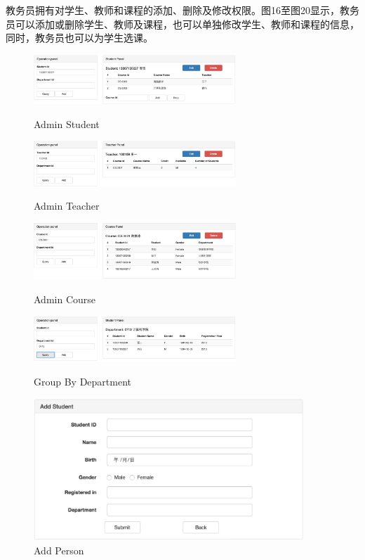 \documentclass[a4paper, 11pt, nofonts, nocap, fancyhdr]{ctexart}
\begin{document}
	教务员拥有对学生、教师和课程的添加、删除及修改权限。图16至图20显示，教务员可以添加或删除学生、教师及课程，也可以单独修改学生、教师和课程的信息，同时，教务员也可以为学生选课。

	\begin{figure}[h]
		\begin{minipage}{0.5\textwidth}
			\centering
			\includegraphics[width=3in]{adstu}
			\caption{Admin Student}
		\end{minipage}%
		\begin{minipage}{0.5\textwidth}
			\centering
			\includegraphics[width=3in]{adtea}
			\caption{Admin Teacher}
		\end{minipage}

		\begin{minipage}{0.5\textwidth}
			\centering
			\includegraphics[width=3in]{adcou}
			\caption{Admin Course}
		\end{minipage}%
		\begin{minipage}{0.5\textwidth}
			\centering
			\includegraphics[width=3in]{addep}
			\caption{Group By Department}
		\end{minipage}

		\centering
		\includegraphics[width=4in]{adadd}
		\caption{Add Person}
	\end{figure}
\end{document}

